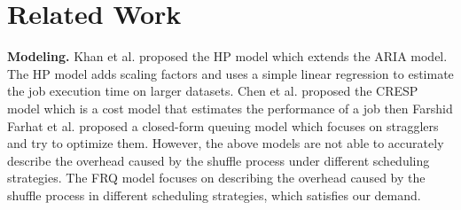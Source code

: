 \section{Related Work}\label{related}

{\color{black}
\textbf{Modeling.} 
Khan et al. \cite{khan2016hadoop} proposed the HP model which extends the ARIA model. The HP model adds scaling factors and uses a simple linear regression to estimate the job execution time on larger datasets.
Chen et al. \cite{chen2014cresp} proposed the CRESP model which is a cost model that estimates the performance of a job then 
Farshid Farhat et al.\cite{farhat2016stochastic} proposed a closed-form queuing model which focuses on stragglers and try to optimize them. 
However, the above models are not able to accurately describe the overhead caused by the shuffle process under different scheduling strategies. 
The FRQ model focuses on describing the overhead caused by the shuffle process in different scheduling strategies, which satisfies our demand.

}

